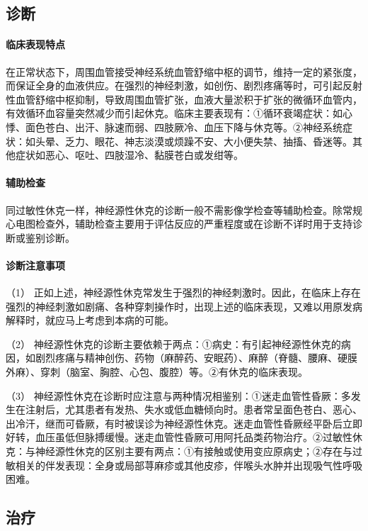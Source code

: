 \subsection{诊断}

\paragraph{临床表现特点}

在正常状态下，周围血管接受神经系统血管舒缩中枢的调节，维持一定的紧张度，而保证全身的血液供应。在强烈的神经刺激，如创伤、剧烈疼痛等时，可引起反射性血管舒缩中枢抑制，导致周围血管扩张，血液大量淤积于扩张的微循环血管内，有效循环血容量突然减少而引起休克。临床主要表现有：①循环衰竭症状：如心悸、面色苍白、出汗、脉速而弱、四肢厥冷、血压下降与休克等。②神经系统症状：如头晕、乏力、眼花、神志淡漠或烦躁不安、大小便失禁、抽搐、昏迷等。其他症状如恶心、呕吐、四肢湿冷、黏膜苍白或发绀等。

\paragraph{辅助检查}

同过敏性休克一样，神经源性休克的诊断一般不需影像学检查等辅助检查。除常规心电图检查外，辅助检查主要用于评估反应的严重程度或在诊断不详时用于支持诊断或鉴别诊断。

\paragraph{诊断注意事项}

（1）
正如上述，神经源性休克常发生于强烈的神经刺激时。因此，在临床上存在强烈的神经刺激如剧痛、各种穿刺操作时，出现上述的临床表现，又难以用原发病解释时，就应马上考虑到本病的可能。

（2）
神经源性休克的诊断主要依赖于两点：①病史：有引起神经源性休克的病因，如剧烈疼痛与精神创伤、药物（麻醉药、安眠药）、麻醉（脊髓、腰麻、硬膜外麻）、穿刺（脑室、胸腔、心包、腹腔）等。②有休克的临床表现。

（3）
神经源性休克在诊断时应注意与两种情况相鉴别：①迷走血管性昏厥：多发生在注射后，尤其患者有发热、失水或低血糖倾向时。患者常呈面色苍白、恶心、出冷汗，继而可昏厥，有时被误诊为神经源性休克。迷走血管性昏厥经平卧后立即好转，血压虽低但脉搏缓慢。迷走血管性昏厥可用阿托品类药物治疗。②过敏性休克：与神经源性休克的区别主要有两点：①有接触或使用变应原病史；②存在与过敏相关的伴发表现：全身或局部荨麻疹或其他皮疹，伴喉头水肿并出现吸气性呼吸困难。

\subsection{治疗}

